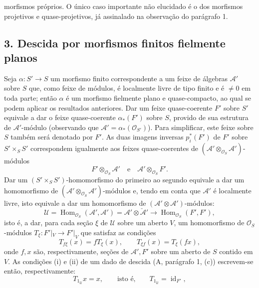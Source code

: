 morfismos próprios. O único caso importante não elucidado é o dos
morfismos projetivos e quase-projetivos, já assinalado na observação do
parágrafo 1.

\subsection*{3. Descida por morfismos finitos fielmente planos}

Seja $\alpha:S'\longrightarrow S$ um morfismo finito correspondente a um feixe de
álgebras $\mathcal A'$ sobre $S$ que, como feixe de módulos, é localmente livre
de tipo finito e é $\ne0$ em toda parte; então $\alpha$ é um morfismo
fielmente plano e quase-compacto, ao qual se podem aplicar os resultados
anteriores. Dar um feixe quase-coerente $F'$ sobre $S'$ equivale a dar o feixe
quase-coerente $\alpha_*(F')$ sobre $S$, provido de sua estrutura de
$\mathcal A'$-módulo (observando que
$\mathcal A'=\alpha_*(\mathcal O_{S'})$). Para simplificar, este feixe sobre $S$
também será denotado por $F'$. As duas imagens inversas $p_i^*(F')$ de $F'$
sobre $S'\times_SS'$ correspondem igualmente aos feixes quase-coerentes de
$(\mathcal A'\otimes_{\mathcal O_S}\mathcal A')$-módulos
\[
  F'\otimes_{\mathcal O_S}\mathcal A'
  \quad\text{e}\quad
  \mathcal A'\otimes_{\mathcal O_S}F'.
\]
Dar um $(S'\times_SS')$-homomorfismo do primeiro ao segundo equivale a dar um
homomorfismo de $(\mathcal A'\otimes_{\mathcal O_S}\mathcal A')$-módulos e,
tendo em conta que $\mathcal A'$ é localmente livre, isto equivale a dar
um homomorfismo de $(\mathcal A'\otimes\mathcal A')$-módulos:
\[
  \mathcal U=
  \operatorname{Hom}_{\mathcal O_S}(\mathcal A',\mathcal A')
  =\mathcal A'\otimes\check{\mathcal A}'
  \longrightarrow
  \operatorname{Hom}_{\mathcal O_S}(F',F'),
\]
isto é, a dar, para cada seção $\xi$ de $\mathcal U$ sobre um aberto $V$,
um homomorfismo de $\mathcal O_S$-módulos
$T_\xi:F'|_V\longrightarrow F'|_V$ que satisfaz as condições
\begin{equation}
  T_{f\xi}(x)=fT_\xi(x),
  \qquad T_{\xi f}(x)=T_\xi(fx),
  \tag{3.1}
\end{equation}
onde $f,x$ são, respectivamente, seções de $\mathcal A',F'$ sobre um
aberto de $S$ contido em $V$. As condições (i) e (ii) de um dado de
descida (A, parágrafo 1, (c)) escrevem-se então, respectivamente:
\begin{equation}
  T_{1_{\mathcal U}}x=x,
  \qquad\text{isto é,}\qquad
  T_{1_{\mathcal U}}=\operatorname{id}_{F'},
  \tag{3.2}
\end{equation}
